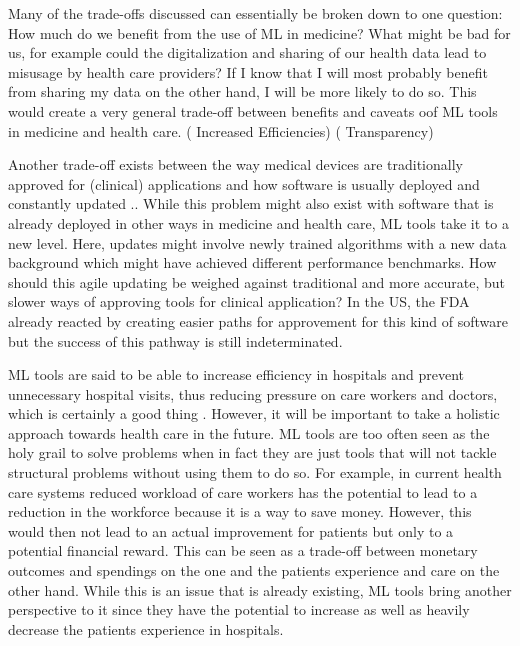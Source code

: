  Many of the trade-offs discussed can essentially be broken down to one question: How much do we benefit from the use of ML in medicine? What might be bad for us, for example could the digitalization and sharing of our health data lead to misusage by health care providers? If I know that I will most probably benefit from sharing my data on the other hand, I will be more likely to do so. This would create a very general trade-off between benefits and caveats oof ML tools in medicine and health care. (\cite{topol2019high} Increased Efficiencies) (\cite{he2019practical} Transparency)


Another trade-off exists between the way medical devices are traditionally approved for (clinical) applications and how software is usually deployed and constantly updated \cite{he2019practical}.. While this problem might also exist with software that is already deployed in other ways in medicine and health care, ML tools take it to a new level. Here, updates might involve newly trained algorithms with a new data background which might have achieved different performance benchmarks. How should this agile updating be weighed against traditional and more accurate, but slower ways of approving tools for clinical application? In the US, the FDA already reacted by creating easier paths for approvement for this kind of software but the success of this pathway is still indeterminated.


ML tools are said to be able to increase efficiency in hospitals and prevent unnecessary hospital visits, thus reducing pressure on care workers and doctors, which is certainly a good thing \cite{horgan2019artificial}. However, it will be important to take a holistic approach towards health care in the future. ML tools are too often seen as the holy grail to solve problems when in fact they are just tools that will not tackle structural problems without using them to do so. For example, in current health care systems reduced workload of care workers has the potential to lead to a reduction in the workforce because it is a way to save money. However, this would then not lead to an actual improvement for patients but only to a potential financial reward. This can be seen as a trade-off between monetary outcomes and spendings on the one  and the patients experience and care on the other hand. While this is an issue that is already existing, ML tools bring another perspective to it since they have the potential to increase as well as heavily decrease the patients experience in hospitals.


